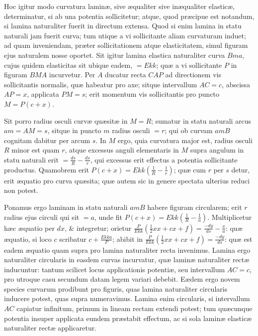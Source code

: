 Hoc igitur modo curvatura laminæ, sive æqualiter sive inæqualiter elasticæ, determinatur, si ab una potentia sollicitetur; atque, quod præcipue est notandum, si lamina naturaliter fuerit in directum extensa. Quod si enim lamina in statu naturali jam fuerit curva; tum utique a vi sollicitante aliam curvaturam induet; ad quam inveniendam, præter sollicitationem atque elasticitatem, simul figuram ejus naturalem nosse oportet. Sit igitur lamina elastica naturaliter curva $Bma$, cujus quidem elasticitas sit ubique eadem, $=Ekk$; quæ a vi sollicitante $P$ in figuram $BMA$ incurvetur. Per $A$ ducatur recta $CAP$ ad directionem vis sollicitantis normalis, quæ habeatur pro axe; sitque intervallum $AC=c$, abscissa $AP=x$, applicata $PM=s$; erit momentum vis sollicitantis pro puncto $M=P(c+x)$.

Sit porro radius osculi curvæ quæsitæ in $M=R$; sumatur in statu naturali arcus $am=AM=s$, sitque in puncto $m$ radius osculi $=r$; qui ob curvam $amB$ cognitam dabitur per arcum $s$. In $M$ ergo, quia curvatura major est, radius osculi $R$ minor est quam $r$, atque excessus anguli elementaris in $M$ supra angulum in statu naturali erit $=\frac{ds}R-\frac{ds}r$, qui excessus erit effectus a potentia sollicitante productus. Quamobrem erit $P(c+x)=Ekk(\frac1R-\frac1r)$; quæ cum $r$ per $s$ detur, erit æquatio pro curva quæsita; quæ autem sic in genere spectata ulterius reduci non potest.

Ponamus ergo laminam in statu naturali $amB$ habere figuram circularem; erit $r$ radius ejus circuli qui sit $=a$, unde fit $P(c+x)=Ekk(\frac1R-\frac1a)$. Multiplicetur hæc æquatio per $dx$, \& integretur; orietur $\frac P{Ekk}(\frac12xx+cx+f)=\frac{-dy}{ds}-\frac xa$: quæ æquatio, si loco $c$ scribatur $c+\frac{Ekka}P$; abibit in $\frac P{Ekk}(\frac12xx+cx+f)=\frac{-dy}{ds}$: quæ est eadem æquatio quam supra pro lamina naturaliter recta invenimus. Lamina ergo naturaliter circularis in easdem curvas incurvatur, quæ laminæ naturaliter rectæ inducuntur: tantum scilicet locus applicationis potentiæ, seu intervallum $AC=c$, pro utroque casu secundum datam legem variari debebit. Eædem ergo novem species curvarum prodibunt pro figuris, quas lamina naturaliter circularis inducere potest, quas supra numeravimus. Lamina enim circularis, si intervallum $AC$ capiatur infinitum, primum in lineam rectam extendi potest; tum quæcunque potentia insuper applicata eundem præstabit effectum, ac si sola laminæ elasticæ naturaliter rectæ applicaretur.

